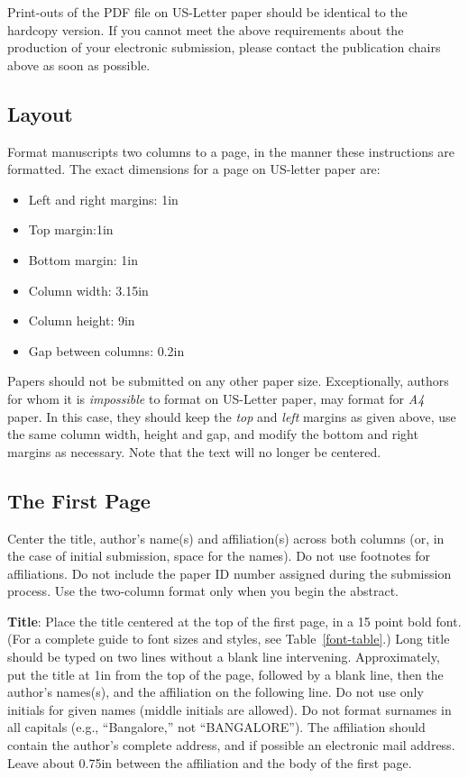 \documentclass[11pt,letterpaper]{article}
\begin{document}
Print-outs of the PDF file on US-Letter paper should be identical to the
hardcopy version.  If you cannot meet the above requirements about the
production of your electronic submission, please contact the
publication chairs above  as soon as possible.


\subsection{Layout}
\label{ssec:layout}

Format manuscripts two columns to a page, in the manner these
instructions are formatted. The exact dimensions for a page on US-letter
paper are:

\begin{itemize}
\item Left and right margins: 1in
\item Top margin:1in
\item Bottom margin: 1in
\item Column width: 3.15in
\item Column height: 9in
\item Gap between columns: 0.2in
\end{itemize}

\noindent Papers should not be submitted on any other paper size. Exceptionally,
authors for whom it is \emph{impossible} to format on US-Letter paper,
may format for \emph{A4} paper. In this case, they should keep the \emph{top}
and \emph{left} margins as given above, use the same column width,
height and gap, and modify the bottom and right margins as necessary.
Note that the text will no longer be centered.

\subsection{The First Page}
\label{ssec:first}

Center the title, author's name(s) and affiliation(s) across both
columns (or, in the case of initial submission, space for the names). 
Do not use footnotes for affiliations.  Do not include the
paper ID number assigned during the submission process. 
Use the two-column format only when you begin the abstract.

{\bf Title}: Place the title centered at the top of the first page, in
a 15 point bold font.  (For a complete guide to font sizes and styles, see Table~\ref{font-table}.)
Long title should be typed on two lines without
a blank line intervening. Approximately, put the title at 1in from the
top of the page, followed by a blank line, then the author's names(s),
and the affiliation on the following line.  Do not use only initials
for given names (middle initials are allowed). Do not format surnames
in all capitals (e.g., ``Bangalore,'' not ``BANGALORE'').  The affiliation should
contain the author's complete address, and if possible an electronic
mail address. Leave about 0.75in between the affiliation and the body
of the first page.
\end{document}
